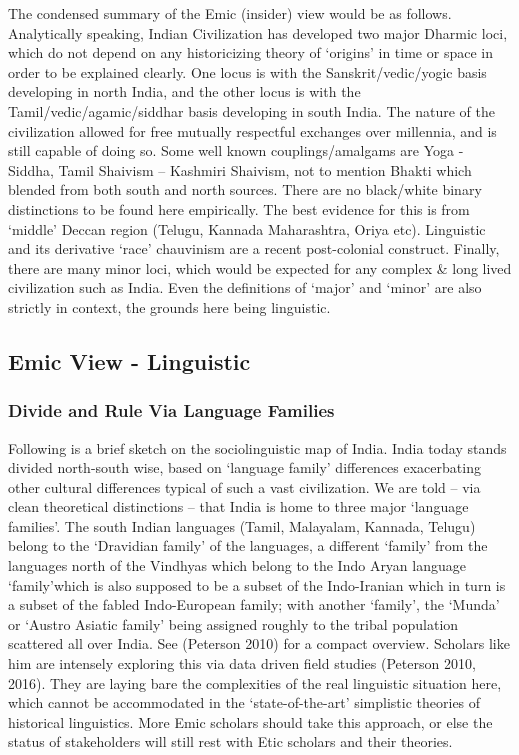 The condensed summary of the Emic (insider) view would be as follows. Analytically speaking, Indian Civilization has developed two major Dharmic loci, which do not depend on any historicizing theory of ‘origins’ in time or space in order to be explained clearly. One locus is with the Sanskrit/vedic/yogic basis developing in north India, and the other locus is with the Tamil/vedic/agamic/siddhar basis developing in south India. The nature of the civilization allowed for free mutually respectful exchanges over millennia, and is still capable of doing so. Some well known couplings/amalgams are Yoga - Siddha, Tamil Shaivism – Kashmiri Shaivism, not to mention Bhakti which blended from both south and north sources. There are no black/white binary distinctions to be found here empirically. The best evidence for this is from ‘middle’ Deccan region (Telugu, Kannada Maharashtra, Oriya etc). Linguistic and its derivative ‘race’ chauvinism are a recent post-colonial construct. Finally, there are many minor loci, which would be expected for any complex \& long lived civilization such as India. Even the definitions of ‘major’ and ‘minor’ are also strictly in context, the grounds here being linguistic.

\subsection*{Emic View - Linguistic}

\vskip -8pt

\subsubsection*{Divide and Rule Via Language Families}

\vskip -8pt

Following is a brief sketch on the sociolinguistic map of India. India today stands divided north-south wise, based on ‘language family’ differences exacerbating other cultural differences typical of such a vast civilization. We are told – via clean theoretical distinctions – that India is home to three major ‘language families’. The south Indian languages (Tamil, Malayalam, Kannada, Telugu) belong to the ‘Dravidian family’ of the languages, a different ‘family’ from the languages north of the Vindhyas which belong to the Indo Aryan language ‘family’which is also supposed to be a subset of the Indo-Iranian which in turn is a subset of the fabled Indo-European family; with another ‘family’, the ‘Munda’ or ‘Austro Asiatic family’ being assigned roughly to the tribal population scattered all over India. See (Peterson 2010) for a compact overview. Scholars like him are intensely exploring this via data driven field studies (Peterson 2010, 2016). They are laying bare the complexities of the real linguistic situation here, which cannot be accommodated in the ‘state-of-the-art’ simplistic theories of historical linguistics. More Emic scholars should take this approach, or else the status of stakeholders will still rest with Etic scholars and their theories.

